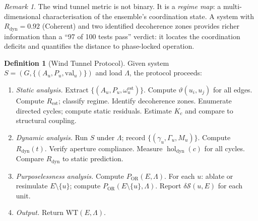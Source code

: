 \documentclass[twocolumn,a4paper,11pt]{article}
\theoremstyle{plain}
\theoremstyle{definition}
\newtheorem{definition}[theorem]{Definition}
\theoremstyle{remark}
\newtheorem{remark}[theorem]{Remark}
\DeclareMathOperator{\hol}{hol}
\DeclareMathOperator{\OR}{OR}
\begin{document}
\begin{remark}
The wind tunnel metric is not binary. It is a \emph{regime map}: a
multi-dimensional characterisation of the ensemble's coordination state.
A system with $R_\mathrm{dyn} = 0.92$ (Coherent) and two identified
decoherence zones provides richer information than a ``97 of 100 tests
pass'' verdict: it locates the coordination deficits and quantifies the
distance to phase-locked operation.
\end{remark}

\begin{definition}[Wind Tunnel Protocol]
\label{def:wt-protocol}
Given system $S = (G, \{(A_u, P_u, \mathrm{val}_u)\})$ and load $\Lambda$,
the protocol proceeds:
\begin{enumerate}[leftmargin=*]
  \item \textit{Static analysis.} Extract $\{(A_u, P_u,
        \omega_u^\mathrm{est})\}$. Compute $\vartheta(u_i, u_j)$ for
        all edges. Compute $R_\mathrm{est}$; classify regime. Identify
        decoherence zones. Enumerate directed cycles; compute static
        residuals. Estimate $K_c$ and compare to structural coupling.
  \item \textit{Dynamic analysis.} Run $S$ under $\Lambda$; record
        $\{(\gamma_u, \Gamma_u, M_u)\}$. Compute $R_\mathrm{dyn}(t)$.
        Verify aperture compliance. Measure $\hol_\mathrm{dyn}(c)$ for
        all cycles. Compare $R_\mathrm{dyn}$ to static prediction.
  \item \textit{Purposelessness analysis.} Compute $P_\OR(E, \Lambda)$.
        For each $u$: ablate or resimulate $E \setminus \{u\}$; compute
        $P_\OR(E \setminus \{u\}, \Lambda)$. Report $\delta\mathcal{S}
        (u, E)$ for each unit.
  \item \textit{Output.} Return $\mathrm{WT}(E, \Lambda)$.
\end{enumerate}
\end{definition}
\end{document}
